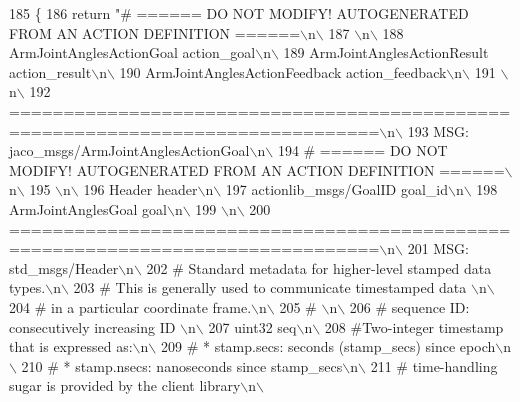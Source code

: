 \begin{DoxyCode}
185   \{
186     \textcolor{keywordflow}{return} \textcolor{stringliteral}{"# ====== DO NOT MODIFY! AUTOGENERATED FROM AN ACTION DEFINITION ======\(\backslash\)n\(\backslash\)}
187 \textcolor{stringliteral}{\(\backslash\)n\(\backslash\)}
188 \textcolor{stringliteral}{ArmJointAnglesActionGoal action\_goal\(\backslash\)n\(\backslash\)}
189 \textcolor{stringliteral}{ArmJointAnglesActionResult action\_result\(\backslash\)n\(\backslash\)}
190 \textcolor{stringliteral}{ArmJointAnglesActionFeedback action\_feedback\(\backslash\)n\(\backslash\)}
191 \textcolor{stringliteral}{\(\backslash\)n\(\backslash\)}
192 \textcolor{stringliteral}{================================================================================\(\backslash\)n\(\backslash\)}
193 \textcolor{stringliteral}{MSG: jaco\_msgs/ArmJointAnglesActionGoal\(\backslash\)n\(\backslash\)}
194 \textcolor{stringliteral}{# ====== DO NOT MODIFY! AUTOGENERATED FROM AN ACTION DEFINITION ======\(\backslash\)n\(\backslash\)}
195 \textcolor{stringliteral}{\(\backslash\)n\(\backslash\)}
196 \textcolor{stringliteral}{Header header\(\backslash\)n\(\backslash\)}
197 \textcolor{stringliteral}{actionlib\_msgs/GoalID goal\_id\(\backslash\)n\(\backslash\)}
198 \textcolor{stringliteral}{ArmJointAnglesGoal goal\(\backslash\)n\(\backslash\)}
199 \textcolor{stringliteral}{\(\backslash\)n\(\backslash\)}
200 \textcolor{stringliteral}{================================================================================\(\backslash\)n\(\backslash\)}
201 \textcolor{stringliteral}{MSG: std\_msgs/Header\(\backslash\)n\(\backslash\)}
202 \textcolor{stringliteral}{# Standard metadata for higher-level stamped data types.\(\backslash\)n\(\backslash\)}
203 \textcolor{stringliteral}{# This is generally used to communicate timestamped data \(\backslash\)n\(\backslash\)}
204 \textcolor{stringliteral}{# in a particular coordinate frame.\(\backslash\)n\(\backslash\)}
205 \textcolor{stringliteral}{# \(\backslash\)n\(\backslash\)}
206 \textcolor{stringliteral}{# sequence ID: consecutively increasing ID \(\backslash\)n\(\backslash\)}
207 \textcolor{stringliteral}{uint32 seq\(\backslash\)n\(\backslash\)}
208 \textcolor{stringliteral}{#Two-integer timestamp that is expressed as:\(\backslash\)n\(\backslash\)}
209 \textcolor{stringliteral}{# * stamp.secs: seconds (stamp\_secs) since epoch\(\backslash\)n\(\backslash\)}
210 \textcolor{stringliteral}{# * stamp.nsecs: nanoseconds since stamp\_secs\(\backslash\)n\(\backslash\)}
211 \textcolor{stringliteral}{# time-handling sugar is provided by the client library\(\backslash\)n\(\backslash\)}

\end{DoxyCode}
